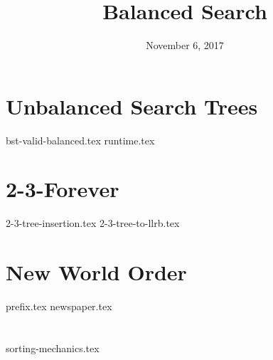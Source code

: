 \documentclass[11pt]{exam}
\title{Balanced Search}
\date{November 6, 2017}
\begin{document}
\maketitle

\section{Unbalanced Search Trees}
\begin{questions}
{bst-valid-balanced.tex}
{runtime.tex}
\end{questions}

\section{2-3-Forever}
\begin{questions}
{2-3-tree-insertion.tex}
{2-3-tree-to-llrb.tex}
\end{questions}

\section{New World Order}
\begin{questions}
{prefix.tex}
{newspaper.tex}
\end{questions}

\clearpage

\section{}
\begin{questions}
{sorting-mechanics.tex}
\end{questions}
\end{document}
